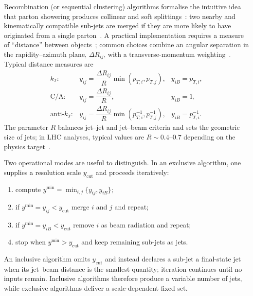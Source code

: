 Recombination (or sequential clustering) algorithms formalise the intuitive idea that parton showering produces collinear and soft splittings~\cite{Catani:1993,Dokshitzer:1997,Salam:2010}: two nearby and kinematically compatible sub-jets are merged if they are more likely to have originated from a single parton~\cite{Catani:1993,Dokshitzer:1997}. A practical implementation requires a measure of ``distance'' between objects~\cite{Catani:1993,Cacciari:2011ma}; common choices combine an angular separation in the rapidity–azimuth plane, $\Delta R_{ij}$, with a transverse-momentum weighting~\cite{Catani:1993,Cacciari:2008gp}. Typical distance measures are~\cite{Catani:1993,Dokshitzer:1997,Cacciari:2008gp}
\begin{equation}
  \begin{array}{lll}
  k_T: & y_{ij}=\dfrac{\Delta R_{ij}}{R}\min(p_{T,i},p_{T,j}), & y_{iB}=p_{T,i},\\[6pt]
  \mathrm{C/A}: & y_{ij}=\dfrac{\Delta R_{ij}}{R}, & y_{iB}=1,\\[6pt]
  \text{anti-}k_T: & y_{ij}=\dfrac{\Delta R_{ij}}{R}\min(p_{T,i}^{-1},p_{T,j}^{-1}), & y_{iB}=p_{T,i}^{-1}.
  \end{array}  
\end{equation}
The parameter $R$ balances jet–jet and jet–beam criteria and sets the geometric size of jets; in LHC analyses, typical values are $R\sim0.4\text{--}0.7$ depending on the physics target~\cite{Cacciari:2011ma}.

Two operational modes are useful to distinguish. In an exclusive algorithm, one supplies a resolution scale $y_{\text{cut}}$ and proceeds iteratively:
\begin{enumerate}
  \item compute $y^{\min}=\min_{i,j}\{y_{ij},y_{iB}\}$;
  \item if $y^{\min}=y_{ij}<y_{\text{cut}}$ merge $i$ and $j$ and repeat;
  \item if $y^{\min}=y_{iB}<y_{\text{cut}}$ remove $i$ as beam radiation and repeat;
  \item stop when $y^{\min}>y_{\text{cut}}$ and keep remaining sub-jets as jets.
\end{enumerate}
An inclusive algorithm omits $y_{\text{cut}}$ and instead declares a sub-jet a final-state jet when its jet–beam distance is the smallest quantity; iteration continues until no inputs remain. Inclusive algorithms therefore produce a variable number of jets, while exclusive algorithms deliver a scale-dependent fixed set.

